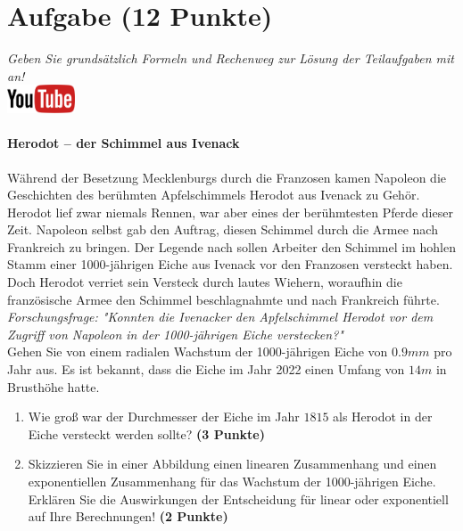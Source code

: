 \documentclass[a4paper, 10pt]{scrartcl}\usepackage[]{graphicx}\usepackage[]{xcolor}
\begin{document}
\section{Aufgabe \hfill (12 Punkte)}

\textit{Geben Sie grunds{\"a}tzlich Formeln und Rechenweg zur L{\"o}sung der
  Teilaufgaben mit an!} \\[1Ex]

\hfill\href{https://youtu.be/Fu8kN0Uj13Y}{\includegraphics[width =
  2cm]{img/youtube}} %
\hspace{2Ex}

\paragraph{Herodot – der Schimmel aus Ivenack}

W{\"a}hrend der Besetzung Mecklenburgs durch die Franzosen kamen Napoleon die
Geschichten des ber{\"u}hmten Apfelschimmels Herodot aus Ivenack zu
Geh{\"o}r. Herodot lief zwar niemals Rennen, war aber eines der ber{\"u}hmtesten
Pferde dieser Zeit. Napoleon selbst gab den Auftrag, diesen
Schimmel durch die Armee nach Frankreich zu bringen. Der Legende nach
sollen Arbeiter den Schimmel im hohlen Stamm einer 1000-j{\"a}hrigen Eiche aus Ivenack vor
den Franzosen versteckt haben. Doch Herodot verriet sein Versteck durch
lautes Wiehern, woraufhin die franz{\"o}sische Armee den Schimmel
beschlagnahmte und nach Frankreich f{\"u}hrte. \\



\textit{Forschungsfrage: "Konnten die Ivenacker den Apfelschimmel Herodot
  vor dem Zugriff von Napoleon in der 1000-j{\"a}hrigen Eiche verstecken?"} \\

Gehen Sie von einem radialen Wachstum der 1000-j{\"a}hrigen Eiche von
$0.9mm$ pro Jahr aus. Es ist bekannt, dass die Eiche im
Jahr 2022 einen Umfang von $14m$ in Brusth{\"o}he hatte.

\begin{enumerate}
\item Wie gro{\ss} war der Durchmesser der Eiche im Jahr $1815$ als
  Herodot in der Eiche versteckt werden sollte?
  \textbf{(3 Punkte)}
\item Skizzieren Sie in einer Abbildung einen linearen Zusammenhang und einen
exponentiellen Zusammenhang f{\"u}r das Wachstum der 1000-j{\"a}hrigen Eiche. Erkl{\"a}ren Sie die
Auswirkungen der Entscheidung f{\"u}r linear oder exponentiell auf Ihre
Berechnungen! \textbf{(2 Punkte)}
\end{enumerate}
 
\end{document}
